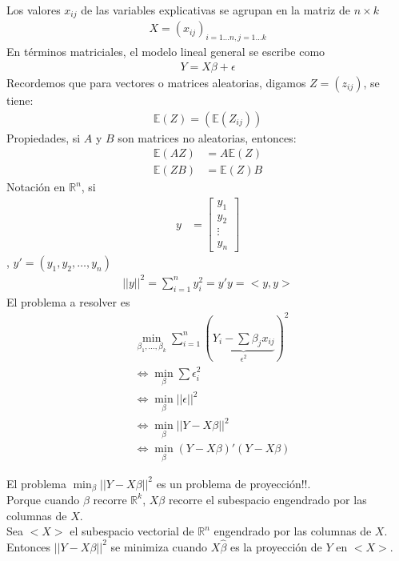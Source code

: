 \documentclass[10pt]{article}
\theoremstyle{plain}
\theoremstyle{definition}
\begin{document}
  Los valores $x_{ij}$ de las variables explicativas se agrupan en la matriz de $n\times k$
  \begin{align*}
  X = (x_{ij})_{i=1\ldots n, j=1\ldots k}
  \end{align*}
  En términos matriciales, el modelo lineal general se escribe como
  \begin{align*}
  Y = X \beta + \epsilon
  \end{align*}
  Recordemos que para vectores o matrices aleatorias, digamos $Z = (z_{ij})$, se tiene:
  \begin{align*}
  \mathbb{E}(Z) = (\mathbb{E}(Z_{ij}))
  \end{align*}
  Propiedades, si $A$ y $B$ son matrices no aleatorias, entonces:
  \begin{align*}
  \mathbb{E}(AZ) &= A \mathbb{E}(Z)\\
  \mathbb{E}(ZB) &= \mathbb{E}(Z) B
  \end{align*}
  Notación en $\mathbb{R}^n$, si
 \begin{align*}
    y &= \begin{bmatrix}
           y_{1} \\
           y_{2} \\
           \vdots \\
           y_{n}
         \end{bmatrix}
  \end{align*}
, $y' = (y_{1},y_{2},\ldots, y_{n})$\\
\begin{align*}
||y||^2 = \sum_{i=1}^n y_{i}^2 = y'y = <y,y>
\end{align*}  
El problema a resolver es
\begin{align*}
& \min_{\beta_{1},\ldots, \beta_{k}} \sum_{i=1}^n (\underbrace{Y_{i}-\sum \beta_{j} x_{ij}}_{\epsilon^2})^2\\
& \Leftrightarrow \min_{\beta} \sum \epsilon_{i}^2\\
& \Leftrightarrow \min_{\beta} ||\epsilon||^2\\
& \Leftrightarrow \min_{\beta} ||Y-X\beta||^2\\
& \Leftrightarrow \min_{\beta} (Y-X\beta)'(Y-X\beta)
\end{align*}

El problema $\min_{\beta} ||Y-X\beta||^2$ es un problema de proyección!!.\\

Porque cuando $\beta$ recorre $\mathbb{R}^k$, $X\beta$ recorre el subespacio engendrado por las columnas de $X$.\\
Sea $<X>$ el subespacio vectorial de $\mathbb{R}^n$ engendrado por las columnas de $X$.\\
Entonces $||Y-X\beta||^2$ se minimiza cuando $X\hat{\beta}$ es la proyección de $Y$ en $<X>$.
\end{document}
